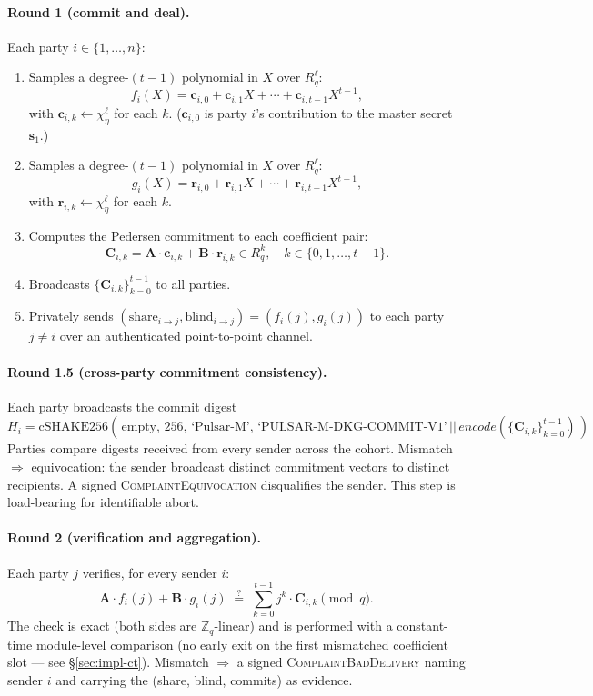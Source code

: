 \documentclass[11pt,a4paper]{article}
\theoremstyle{definition}
\theoremstyle{remark}
\newcommand{\Rq}{R_q}
\newcommand{\Zq}{\mathbb{Z}_q}
\newcommand{\cSHAKE}{\mathrm{cSHAKE256}}
\begin{document}
\paragraph{Round 1 (commit and deal).}
Each party $i \in \{1, \dots, n\}$:
\begin{enumerate}[leftmargin=*, itemsep=0pt]
\item Samples a degree-$(t-1)$ polynomial in $X$ over $\Rq^\ell$:
\[
f_i(X) = \mathbf{c}_{i,0} + \mathbf{c}_{i,1} X + \cdots + \mathbf{c}_{i,t-1} X^{t-1},
\]
with $\mathbf{c}_{i,k} \gets \chi_\eta^\ell$ for each $k$. ($\mathbf{c}_{i,0}$ is party $i$'s contribution to the master secret $\mathbf{s}_1$.)
\item Samples a degree-$(t-1)$ polynomial in $X$ over $\Rq^\ell$:
\[
g_i(X) = \mathbf{r}_{i,0} + \mathbf{r}_{i,1} X + \cdots + \mathbf{r}_{i,t-1} X^{t-1},
\]
with $\mathbf{r}_{i,k} \gets \chi_\eta^\ell$ for each $k$.
\item Computes the Pedersen commitment to each coefficient pair:
\[
\mathbf{C}_{i,k} = \mathbf{A} \cdot \mathbf{c}_{i,k} + \mathbf{B} \cdot \mathbf{r}_{i,k}
\in \Rq^k, \quad k \in \{0, 1, \dots, t-1\}.
\]
\item Broadcasts $\{\mathbf{C}_{i,k}\}_{k=0}^{t-1}$ to all parties.
\item Privately sends $(\text{share}_{i \to j}, \text{blind}_{i \to j}) = (f_i(j), g_i(j))$ to each party $j \ne i$ over an authenticated point-to-point channel.
\end{enumerate}

\paragraph{Round 1.5 (cross-party commitment consistency).}
Each party broadcasts the commit digest
\[
H_i = \cSHAKE(\,\text{empty},\,256,\,\text{`Pulsar-M'},\,
\text{`PULSAR-M-DKG-COMMIT-V1'}\,||\,\mathit{encode}(\{\mathbf{C}_{i,k}\}_{k=0}^{t-1})\,).
\]
Parties compare digests received from every sender across the cohort.
Mismatch $\Rightarrow$ equivocation: the sender broadcast distinct
commitment vectors to distinct recipients. A signed
\textsc{ComplaintEquivocation} disqualifies the sender. This step is
load-bearing for identifiable abort.

\paragraph{Round 2 (verification and aggregation).}
Each party $j$ verifies, for every sender $i$:
\[
\mathbf{A} \cdot f_i(j) + \mathbf{B} \cdot g_i(j) \;\stackrel{?}{=}\;
\sum_{k=0}^{t-1} j^k \cdot \mathbf{C}_{i,k} \pmod q.
\]
The check is exact (both sides are $\Zq$-linear) and is performed
with a constant-time module-level comparison (no early exit on the
first mismatched coefficient slot --- see
\S\ref{sec:impl-ct}). Mismatch $\Rightarrow$ a signed
\textsc{ComplaintBadDelivery} naming sender $i$ and carrying the
(share, blind, commits) as evidence.
\end{document}
